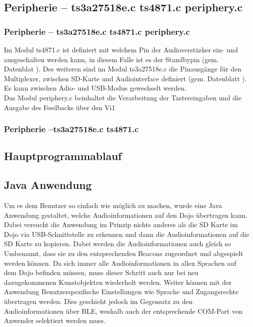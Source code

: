 \subsection{Peripherie -- ts3a27518e.c ts4871.c periphery.c }

\subsubsection{Peripherie -- ts3a27518e.c ts4871.c periphery.c }

Im Modul ts4871.c ist definiert mit welchem Pin der Audioverstärker ein- und ausgeschalten werden kann, in diesem Falle ist es der Standbypin (gem. Datenblat \cite{TS4871}). Des weiteren sind im Modul ts3a27518e.c die Pinausgänge für den Multiplexer, zwischen SD-Karte und Audiointerface definiert (gem. Datenblatt \cite{TS3A27518E}). Es kann zwischen Adio- und USB-Modus gewechselt werden.\\
Das Modul periphery.c beinhaltet die Verarbeitung der Tastereingaben und die Ausgabe des Feedbacks über den Vi1


\subsubsection{Peripherie --ts3a27518e.c ts4871.c}

\subsection{Hauptprogrammablauf}


\subsection{Java Anwendung}

Um es dem Benutzer so einfach wie möglich zu machen, wurde eine Java Anwendung gestaltet, welche Audioinformationen auf den Dojo übertragen kann. Dabei versucht die Anwendung im Prinzip nichts anderes als die SD Karte im Dojo via USB-Schnittstelle zu erkennen und dann die Audioinformationen auf die SD Karte zu kopieren. Dabei werden die Audioinformationen auch gleich so Umbenannt, dass sie zu den entsprechenden Beacons zugeordnet und abgespielt werden können. Da sich immer alle Audioinformationen in allen Sprachen auf dem Dojo befinden müssen, muss dieser Schritt auch nur bei neu dazugekommenen Kunstobjekten wiederholt werden. Weiter können mit der Anwendung Benutzerspezifische Einstellungen wie Sprache und Zugangsrechte übertragen werden. Dies geschieht jedoch im Gegensatz zu den Audioinformationen über BLE, weshalb auch der entsprechende COM-Port von Anwender selektiert werden muss.


